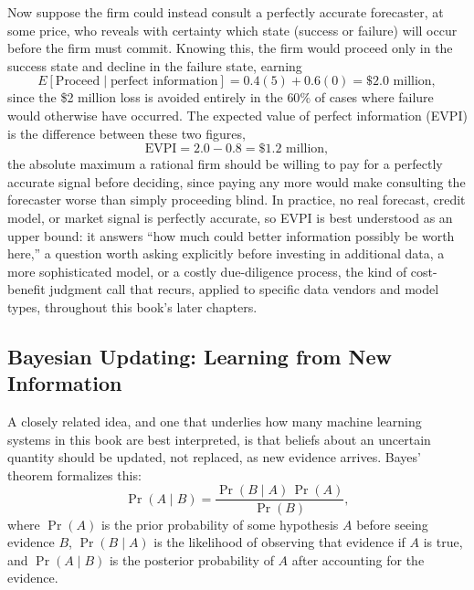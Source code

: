 \documentclass[../ai_in_finance]{subfiles}
\begin{document}
Now suppose the firm could instead consult a perfectly accurate forecaster, at some price, who reveals with certainty which state (success or failure) will occur before the firm must commit. Knowing this, the firm would proceed only in the success state and decline in the failure state, earning
\begin{equation*}
E[\text{Proceed} \mid \text{perfect information}] = 0.4(5) + 0.6(0) = \$2.0 \text{ million},
\end{equation*}
since the \$2 million loss is avoided entirely in the $60\%$ of cases where failure would otherwise have occurred. The expected value of perfect information (EVPI) is the difference between these two figures,
\begin{equation*}
\text{EVPI} = 2.0 - 0.8 = \$1.2 \text{ million},
\end{equation*}
the absolute maximum a rational firm should be willing to pay for a perfectly accurate signal before deciding, since paying any more would make consulting the forecaster worse than simply proceeding blind. In practice, no real forecast, credit model, or market signal is perfectly accurate, so EVPI is best understood as an upper bound: it answers ``how much could better information possibly be worth here,'' a question worth asking explicitly before investing in additional data, a more sophisticated model, or a costly due-diligence process, the kind of cost-benefit judgment call that recurs, applied to specific data vendors and model types, throughout this book's later chapters.

\subsection{Bayesian Updating: Learning from New Information}

A closely related idea, and one that underlies how many machine learning systems in this book are best interpreted, is that beliefs about an uncertain quantity should be updated, not replaced, as new evidence arrives. Bayes' theorem formalizes this:
\begin{equation*}
\Pr(A \mid B) = \frac{\Pr(B \mid A)\,\Pr(A)}{\Pr(B)},
\end{equation*}
where $\Pr(A)$ is the prior probability of some hypothesis $A$ before seeing evidence $B$, $\Pr(B\mid A)$ is the likelihood of observing that evidence if $A$ is true, and $\Pr(A\mid B)$ is the posterior probability of $A$ after accounting for the evidence.
\end{document}
